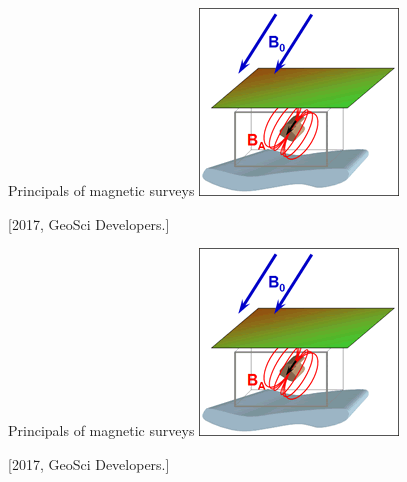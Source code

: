     \begin{frame}
      \begin{PointSix}{Principals of magnetic surveys}
        \includegraphics[width=0.80\linewidth]{Figures/Magnetics/inducing_field.png}

      \tiny [2017, GeoSci Developers.]
      \end{PointSix}
    \end{frame}

    \begin{frame}
      \begin{PointSix}{Principals of magnetic surveys}
        \includegraphics[width=0.80\linewidth]{Figures/Magnetics/inducing_field.png}

      \tiny [2017, GeoSci Developers.]
      \end{PointSix}
    \end{frame}

